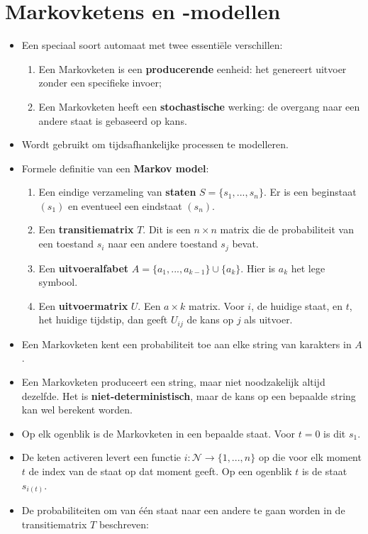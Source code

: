 \section{Markovketens en -modellen}
\begin{itemize}
	\item Een speciaal soort automaat met twee essentiële verschillen:
	\begin{enumerate}
		\item Een Markovketen is een \textbf{producerende} eenheid: het genereert uitvoer zonder een specifieke invoer;
		\item Een Markovketen heeft een \textbf{stochastische} werking: de overgang naar een andere staat is gebaseerd op kans.
	\end{enumerate}
	\item Wordt gebruikt om tijdsafhankelijke processen te modelleren. 
	\item Formele definitie van een \textbf{Markov model}:
	\begin{enumerate}
		\item Een eindige verzameling van \textbf{staten} $S = \{s_1, ..., s_n\}$. Er is een beginstaat $(s_1)$ en eventueel een eindstaat $(s_n)$.
		\item Een \textbf{transitiematrix} $T$. Dit is een $n \times n$ matrix die de probabiliteit van een toestand $s_i$ naar een andere toestand $s_j$ bevat.
		\item Een \textbf{uitvoeralfabet} $A = \{a_1, ..., a_{k - 1}\} \cup \{a_k\}$. Hier is $a_k$ het lege symbool.
		\item Een \textbf{uitvoermatrix} $U$. Een $a \times k$ matrix. Voor $i$, de huidige staat, en $t$, het huidige tijdstip, dan geeft $U_{ij}$ de kans op $j$ als uitvoer.
	\end{enumerate}
	\item Een Markovketen kent een probabiliteit toe aan elke string van karakters in $A$. 
	\item Een Markovketen produceert een string, maar niet noodzakelijk altijd dezelfde. Het is \textbf{niet-deterministisch}, maar de kans op een bepaalde string kan wel berekent worden.
	\item Op elk ogenblik is de Markovketen in een bepaalde staat. Voor $t = 0$ is dit $s_1$.
	\item De keten activeren levert een functie $i : \mathcal{N} \rightarrow \{1, ..., n\}$ op die voor elk moment $t$ de index van de staat op dat moment geeft. Op een ogenblik $t$ is de staat $s_{i(t)}$.
	\item De probabiliteiten om van één staat naar een andere te gaan worden in de transitiematrix $T$ beschreven:
	

\end{itemize}
